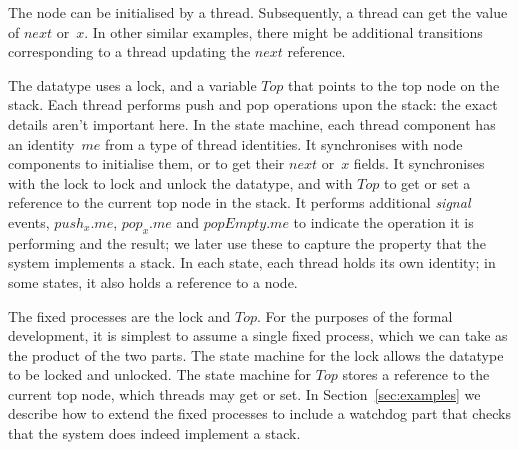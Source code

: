 The node can be initialised by a thread.  Subsequently, a thread
can get the value of $next$ or~$x$.  In other similar examples, there might be
additional transitions corresponding to a thread updating the $next$
reference.

The datatype uses a lock, and a variable $Top$ that points to the top node on
the stack.  Each thread performs push and pop operations upon the stack: the
exact details aren't important here.  In the state machine, each thread
component has an identity~$me$ from a type of thread identities.  It
synchronises with node components to initialise them, or to get their $next$
or~$x$ fields.  It synchronises with the lock to lock and unlock the datatype,
and with $Top$ to get or set a reference to the current top node in the stack.
It performs additional \emph{signal} events, $push_x.me$, $pop_x.me$ and
$popEmpty.me$ to indicate the operation it is performing and the result; we
later use these to capture the property that the system implements a stack.
In each state, each thread holds its own identity; in some states, it also
holds a reference to a node.

The fixed processes are the lock and $Top$.  For the purposes of the formal
development, it is simplest to assume a single fixed process, which we can
take as the product of the two parts.  The state machine for the lock allows
the datatype to be locked and unlocked.  The state machine for $Top$ stores a
reference to the current top node, which threads may get or set.  In
Section~\ref{sec:examples} we describe how to extend the fixed processes to
include a watchdog part that checks that the system does indeed implement a
stack.

